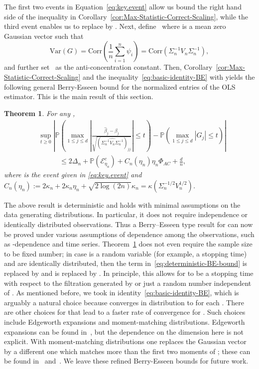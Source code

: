 \documentclass{article}
\newtheorem{theorem}{Theorem}
\begin{document}
The first two
events in Equation~\eqref{eq:key.event} allow us bound the right hand side of the inequality in Corollary~\ref{cor:Max-Statistic-Correct-Scaling}, while the third event enables us to replace   by  .
Next, define
\ where   is a mean zero Gaussian vector such that
\begin{equation}\label{eq:cov.G}
\mbox{Var}(G) = \mbox{Corr}\left( \frac{1}{n} \sum_{i=1}^n \psi_i \right) = \mbox{Corr}\left( \Sigma_n^{-1}V_n\Sigma_n^{-1}
\right),
\end{equation}
and further set
\ as the anti-concentration constant.
Then, Corollary~\ref{cor:Max-Statistic-Correct-Scaling} and the inequality~\eqref{eq:basic-identity-BE} with   yields
the following general Berry-Esseen bound for the normalized entries of the OLS estimator. This is the main result of this section.
\begin{theorem}\label{thm:Berry-Esseen-OLS}
For any  ,
\begin{equation}\label{eq:deterministic-BE-bound}
\begin{split}
&\sup_{t\ge0}\left|\mathbb{P}\left(\max_{1\le j\le d}\left|\frac{\widehat{\beta}_j - \beta_j}{\sqrt{(\widehat{\Sigma_n^{-1}V_n\Sigma_n^{-1}})_{jj}}}\right| \le t\right) - \mathbb{P}\left(\max_{1\le j\le d}|G_j| \le t\right)\right|
\\ &\quad\qquad
\le 2\Delta_n + \mathbb{P}(\mathcal{E}_{\eta_n}^c) + C_n(\eta_n)\eta_n\Phi_{AC} + \frac{d}{n},
\end{split}
\end{equation}
where   is the event given in \eqref{eq:key.event} and $C_n(\eta_n) := 2 \kappa_n + 2 \kappa_n \eta_n + \sqrt{2\log(2
n)} \kappa_n = \kappa(\Sigma_n^{-1/2}V_n^{1/2}) $.
\end{theorem}
The above result is deterministic and holds with minimal assumptions on the data generating distributions. In particular, it does not require independence or identically distributed observations. Thus a Berry--Esseen type result for   can now be proved under various assumptions of dependence among the observations, such as  -dependence and time series. Theorem~\ref{thm:Berry-Esseen-OLS} does not even require the sample size   to be fixed number; in case   is a random variable (for example, a stopping time) and   are identically distributed, then the   term in~\eqref{eq:deterministic-BE-bound} is replaced by   and   is replaced by  . In principle, this allows for   to be a stopping time with respect to the filtration generated by   or just a random number independent of  .
As mentioned before, we took   in identity~\eqref{eq:basic-identity-BE}, which is arguably a natural choice because   converges in distribution to   for each  . There are other choices for   that lead to a faster rate of convergence for  . Such choices include Edgeworth expansions and moment-matching distributions. Edgeworth expansions can be found in~\citet{bhattacharya2010normal}, but the dependence on the dimension here is not explicit. With moment-matching distributions one replaces the Gaussian vector   by a different one which matches more than the first two moments of  ; these can be found in~\cite{boutsikas2015penultimate} and~\cite{zhilova2016non}. We leave these refined Berry-Esseen bounds for future work.
\end{document}

